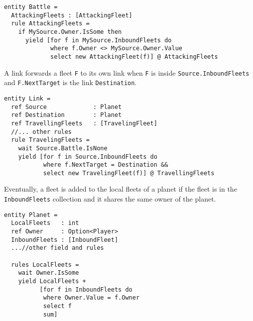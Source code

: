 \begin{lstlisting}
entity Battle =
  AttackingFleets : [AttackingFleet]
  rule AttackingFleets = 
    if MySource.Owner.IsSome then
      yield [for f in MySource.InboundFleets do
             where f.Owner <> MySource.Owner.Value
             select new AttackingFleet(f)] @ AttackingFleets
\end{lstlisting}

\noindent
A link forwards a fleet \texttt{F} to its own link when \texttt{F} is inside \texttt{Source.InboundFleets} and \texttt{F.NextTarget} is the link \texttt{Destination}.
\begin{lstlisting}
entity Link =
  ref Source             : Planet
  ref Destination        : Planet
  ref TravellingFleets   : [TravelingFleet]
  //... other rules
  rule TravelingFleets =
    wait Source.Battle.IsNone
    yield [for f in Source.InboundFleets do
           where f.NextTarget = Destination &&
           select new TravelingFleet(f)] @ TravellingFleets  
\end{lstlisting} 


\noindent
Eventually, a fleet is added to the local fleets of a planet if the fleet is in the \texttt{InboundFleets} collection and it shares the same owner of the planet.

\begin{lstlisting}
entity Planet = 
  LocalFleets   : int
  ref Owner     : Option<Player>
  InboundFleets : [InboundFleet]
  ...//other field and rules

  rules LocalFleets =
    wait Owner.IsSome
    yield LocalFleets + 
          [for f in InboundFleets do
           where Owner.Value = f.Owner
           select f
           sum]
\end{lstlisting}